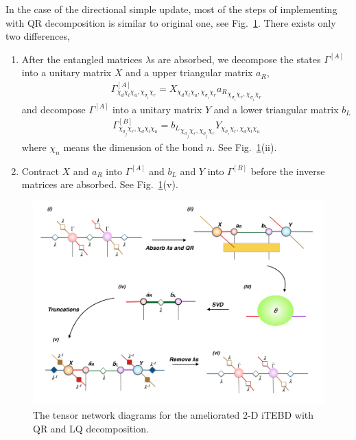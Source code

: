 In the case of the directional simple update, most of the steps of implementing with QR decomposition is similar to original one, see Fig.~\ref{fig319}. There exists only two differences, 
\begin{enumerate}
	\item After the entangled matrices $\lambda$s are absorbed, we decompose the states $\Gamma^{[A]}$ into a unitary matrix $X$ and a upper triangular matrix $a_R$,
		\begin{align}
			\Gamma^{[A]}_{\chi_d \chi_l \chi_u, \chi_{\sigma_i} \chi_r} = X_{\chi_d \chi_l \chi_u, \chi_{\sigma_i} \chi_r} {a_R}_{\chi_{\sigma_i} \chi_r,\chi_{\sigma_i} \chi_r}
		\end{align}
		and decompose $\Gamma^{[A]}$ into a unitary matrix $Y$ and a lower triangular matrix $b_L$
		\begin{align}
			\Gamma^{[B]}_{\chi_{\sigma_j} \chi_r, \chi_d \chi_l \chi_u} = {b_L}_{\chi_{\sigma_j} \chi_r,\chi_{\sigma_j} \chi_r} Y_{\chi_{\sigma_i} \chi_r, \chi_d \chi_l \chi_u} 
		\end{align}
		where $\chi_n$ means the dimension of the bond $n$. See Fig.~\ref{fig319}(ii).
	\item Contract $X$ and $a_R$ into $\Gamma^{[A]}$ and $b_L$ and $Y$ into $\Gamma^{[B]}$ before the inverse matrices are absorbed. See Fig.~\ref{fig319}(v).

\end{enumerate}
\begin{figure}[H] 
	\centering 
	\includegraphics[width=1.00\textwidth]{figures/fig318.png} 
	\caption[The tensor network diagrams for the ameliorated 2-D iTEBD with QR decomposition]{The tensor network diagrams for the ameliorated 2-D iTEBD with QR and LQ decomposition.} 
	\label{fig319} 
\end{figure} 

